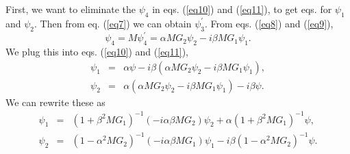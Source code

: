 First, we want to eliminate the $\psi _{4} $ in eqs. (\ref{eq10}) and (\ref{eq11}), to get
eqs. for $\psi _{1} $ and $\psi _{2} $. Then from eq. (\ref{eq7}) we can obtain
$\psi _{3} ^{\prime} $. From eqs. (\ref{eq8}) and (\ref{eq9}),
\begin{equation}
\label{eq12}
\psi _{4} = M\psi _{4} ^{\prime}  =  \alpha MG_{2} \psi _{2} - i\beta MG_{1}
\psi _{1}  .
\end{equation}
We plug this into eqs. (\ref{eq10}) and (\ref{eq11}),
\begin{eqnarray}
\label{eq13}
\psi _{1} &=& \alpha \psi - i\beta (\alpha MG_{2} \psi _{2} - i\beta MG_{1}
\psi _{1} ), \\
\label{eq14}
\psi _{2} &=& \alpha (\alpha MG_{2} \psi _{2} - i\beta MG_{1} \psi _{1} ) -
i\beta \psi .
\end{eqnarray}
We can rewrite these as
\begin{eqnarray}
\label{eq15}
\psi _{1} &=& (1 + \beta ^{2}MG_{1} )^{ - 1}( - i\alpha \beta MG_{2} )\psi
_{2} + \alpha (1 + \beta ^{2}MG_{1} )^{ - 1}\psi , \\
\label{eq16}
\psi _{2} &=& (1 - \alpha ^{2}MG_{2} )^{ - 1}( - i\alpha \beta MG_{1} )\psi
_{1} - i\beta (1 - \alpha ^{2}MG_{2} )^{ - 1}\psi .
\end{eqnarray}



